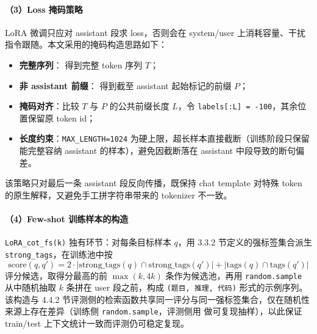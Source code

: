\paragraph{（3）Loss 掩码策略}
LoRA 微调只应对 assistant 段求 loss，否则会在 system/user 上消耗容量、干扰指令跟随。本文采用的掩码构造思路如下：
\begin{itemize}
    \item \textbf{完整序列}： 得到完整 token 序列 $T$；
    \item \textbf{非 assistant 前缀}： 得到截至 assistant 起始标记的前缀 $P$；
    \item \textbf{掩码对齐}：比较 $T$ 与 $P$ 的公共前缀长度 $L$，令 \texttt{labels[:L] = -100}，其余位置保留原 token id；
    \item \textbf{长度约束}：\texttt{MAX\_LENGTH=1024} 为硬上限，超长样本直接截断（训练阶段只保留能完整容纳 assistant 的样本），避免因截断落在 assistant 中段导致的断句偏差。
\end{itemize}
该策略只对最后一条 assistant 段反向传播，既保持 chat template 对特殊 token 的原生解释，又避免手工拼字符串带来的 tokenizer 不一致。

\paragraph{（4）Few-shot 训练样本的构造}
\texttt{LoRA\_cot\_fs(k)} 独有环节：对每条目标样本 $q$，用 3.3.2 节定义的强标签集合派生 \texttt{strong\_tags}，在训练池中按
\[
\text{score}(q, q') = 2\cdot |\mathrm{strong\_tags}(q) \cap \mathrm{strong\_tags}(q')| + |\mathrm{tags}(q) \cap \mathrm{tags}(q')|
\]
评分候选，取得分最高的前 $\max(k, 4k)$ 条作为候选池，再用 \texttt{random.sample} 从中随机抽取 $k$ 条拼在 user 段之前，构成 \texttt{(题目, 推理, 代码)} 形式的示例序列。该构造与 4.4.2 节评测侧的检索函数共享同一评分与同一强标签集合，仅在随机性来源上存在差异（训练侧 \texttt{random.sample}，评测侧用  做可复现抽样），以此保证 train/test 上下文统计一致而评测仍可稳定复现。
